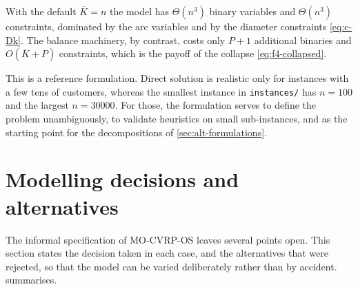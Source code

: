 \documentclass[11pt,a4paper]{article}
\theoremstyle{definition}
\theoremstyle{plain}
\begin{document}
With the default $\overline{K} = n$ the model has $\Theta(n^3)$ binary
variables and $\Theta(n^3)$ constraints, dominated by the arc variables and by
the diameter constraints \eqref{eq:c-Dk}.  The balance machinery, by contrast,
costs only $P+1$ additional binaries and $O(\overline{K} + P)$ constraints,
which is the payoff of the collapse \eqref{eq:f4-collapsed}.

This is a reference formulation.  Direct solution is realistic only for
instances with a few tens of customers, whereas the smallest instance in
\texttt{instances/} has $n = 100$ and the largest $n = \num{30000}$.  For those,
the formulation serves to define the problem unambiguously, to validate
heuristics on small sub-instances, and as the starting point for the
decompositions of \cref{sec:alt-formulations}.

\section{Modelling decisions and alternatives}
\label{sec:variants}

The informal specification of \textup{\textsc{MO-CVRP-OS}} leaves several points open.
This section states the decision taken in each case, and the alternatives that
were rejected, so that the model can be varied deliberately rather than by
accident.   summarises.
\end{document}
